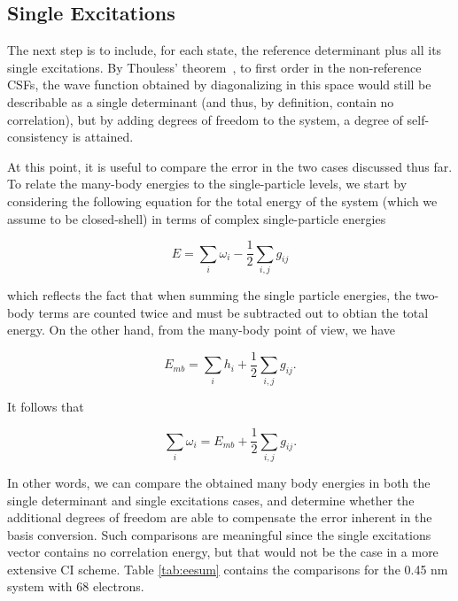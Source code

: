 \subsection{Single Excitations}
\label{subsec:singles}

The next step is to include, for each state, the reference determinant plus all
its single excitations. By Thouless' theorem~\cite{Thouless}, to first order in
the non-reference \acp{CSF}, the wave function obtained by diagonalizing in
this space would still be describable as a single determinant (and
thus, by definition, contain no correlation), but by adding degrees of freedom
to the system, a degree of self-consistency is attained. 

At this point, it is useful to compare the error in the two cases discussed
thus far. To relate the many-body energies to the single-particle levels, we
start by considering the following equation for the total energy of the system
(which we assume to be closed-shell) in terms of complex single-particle
energies

\begin{equation}
	E = \sum_i \omega_i - \frac{1}{2} \sum_{i,j} g_{ij}
	\label{eq:sptotalenergy}
\end{equation}

which reflects the fact that when summing the single particle energies, the
two-body terms are counted twice and must be subtracted out to obtian the total
energy. On the other hand, from the many-body point of view, we have

\begin{equation}
	E_{mb} = \sum_i h_i + \frac{1}{2} \sum_{i,j} g_{ij}.
	\label{eq:mbtotalenergy}
\end{equation}

It follows that

\begin{equation}
	\sum_i \omega_i = E_{mb} + \frac{1}{2} \sum_{i,j} g_{ij}.
	\label{eq:eesumcomparison}
\end{equation}

In other words, we can compare the obtained many body energies in both the
single determinant and single excitations cases, and determine whether the
additional degrees of freedom are able to compensate the error inherent in the
basis conversion. Such comparisons are meaningful since the single excitations
vector contains no correlation energy, but that would not be the case in a more
extensive \ac{CI} scheme. Table \ref{tab:eesum} contains the comparisons for
the 0.45 nm system with 68 electrons.

